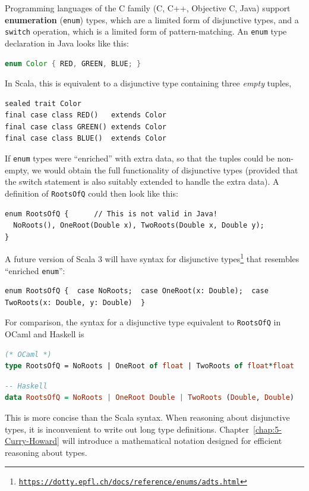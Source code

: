 Programming languages of the C family (C, C++, Objective C, Java)
support \textbf{enumeration} (\lstinline!enum!) types,
which are a limited form of disjunctive types, and a \lstinline!switch!
operation, which is a limited form of pattern-matching. An \lstinline!enum!
type declaration in Java looks like this:
\begin{lstlisting}[language=Java]
enum Color { RED, GREEN, BLUE; } 
\end{lstlisting}
In Scala, this is equivalent to a disjunctive type containing three
\emph{empty} tuples,
\begin{lstlisting}
sealed trait Color
final case class RED()   extends Color
final case class GREEN() extends Color
final case class BLUE()  extends Color
\end{lstlisting}
If \lstinline!enum! types were ``enriched'' with extra data, so
that the tuples could be non-empty, we would obtain the full functionality
of disjunctive types (provided that the switch statement is also suitably
extended to handle the extra data). A definition of \lstinline!RootsOfQ!
could then look like this: 
\begin{lstlisting}
enum RootsOfQ {      // This is not valid in Java!
  NoRoots(), OneRoot(Double x), TwoRoots(Double x, Double y);
}
\end{lstlisting}
A future version of Scala 3 will have syntax for disjunctive types\footnote{\texttt{\href{https://dotty.epfl.ch/docs/reference/enums/adts.html}{https://dotty.epfl.ch/docs/reference/enums/adts.html}}}
that resembles ``enriched \lstinline!enum!'':
\begin{lstlisting}
enum RootsOfQ {  case NoRoots;  case OneRoot(x: Double);  case TwoRoots(x: Double, y: Double)  }
\end{lstlisting}
For comparison, the syntax for a disjunctive type equivalent to \lstinline!RootsOfQ!
in OCaml and Haskell is
\begin{lstlisting}[language=Caml]
(* OCaml *)
type RootsOfQ = NoRoots | OneRoot of float | TwoRoots of float*float
\end{lstlisting}
\begin{lstlisting}[language=Haskell]
-- Haskell
data RootsOfQ = NoRoots | OneRoot Double | TwoRoots (Double, Double)
\end{lstlisting}
This is more concise than the Scala syntax. When reasoning about disjunctive
types, it is inconvenient to write out long type definitions. Chapter~\ref{chap:5-Curry-Howard}
will introduce a mathematical notation designed for efficient reasoning
about types.

